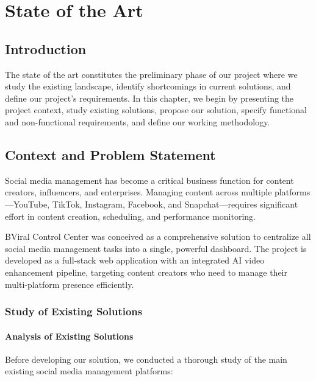 \chapter{State of the Art}

\section*{Introduction}
{}
The state of the art constitutes the preliminary phase of our project where we study the existing landscape, identify shortcomings in current solutions, and define our project's requirements. In this chapter, we begin by presenting the project context, study existing solutions, propose our solution, specify functional and non-functional requirements, and define our working methodology.
\section{Context and Problem Statement}
Social media management has become a critical business function for content creators, influencers, and enterprises. Managing content across multiple platforms---YouTube, TikTok, Instagram, Facebook, and Snapchat---requires significant effort in content creation, scheduling, and performance monitoring.

BViral Control Center was conceived as a comprehensive solution to centralize all social media management tasks into a single, powerful dashboard. The project is developed as a full-stack web application with an integrated AI video enhancement pipeline, targeting content creators who need to manage their multi-platform presence efficiently.
\subsection{Study of Existing Solutions}

\subsubsection{Analysis of Existing Solutions}

Before developing our solution, we conducted a thorough study of the main existing social media management platforms:

